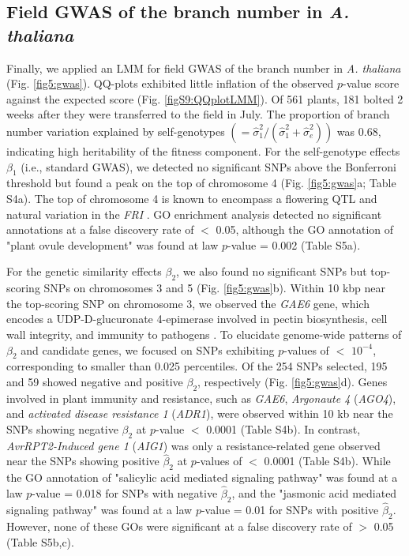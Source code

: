 \documentclass[12pt,]{article}
\begin{document}
\subsection{Field GWAS of the branch number in \textit{A. thaliana}}
Finally, we applied an LMM for field GWAS of the branch number in \textit{A. thaliana} (Fig. \ref{fig5:gwas}). QQ-plots exhibited little inflation of the observed $p$-value score against the expected score (Fig. \ref{figS9:QQplotLMM}). Of 561 plants, 181 bolted 2 weeks after they were transferred to the field in July. The proportion of branch number variation explained by self-genotypes $(=\hat{\sigma}^2_1/(\hat{\sigma}^2_1 + \hat{\sigma}^2_e))$ was 0.68, indicating high heritability of the fitness component. For the self-genotype effects $\beta_1$ (i.e., standard GWAS), we detected no significant SNPs above the Bonferroni threshold but found a peak on the top of chromosome 4 (Fig. \ref{fig5:gwas}a; Table S4a). The top of chromosome 4 is known to encompass a flowering QTL and natural variation in the \textit{FRI} \citep{aranzana2005genome}. GO enrichment analysis detected no significant annotations at a false discovery rate of $<$ 0.05, although the GO annotation of "plant ovule development" was found at law $p$-value = 0.002 (Table S5a). 

For the genetic similarity effects $\beta_2$, we also found no significant SNPs but top-scoring SNPs on chromosomes 3 and 5 (Fig. \ref{fig5:gwas}b). Within 10 kbp near the top-scoring SNP on chromosome 3, we observed the \textit{GAE6} gene, which encodes a UDP-D-glucuronate 4-epimerase involved in pectin biosynthesis, cell wall integrity, and immunity to pathogens \citep{bethke2016pectin}. To elucidate genome-wide patterns of $\beta_2$ and candidate genes, we focused on SNPs exhibiting $p$-values of $<$ $10^{-4}$, corresponding to smaller than 0.025 percentiles. Of the 254 SNPs selected, 195 and 59 showed negative and positive $\beta_2$, respectively (Fig. \ref{fig5:gwas}d). Genes involved in plant immunity and resistance, such as \textit{GAE6}, \textit{Argonaute 4} (\textit{AGO4}), and \textit{ activated disease resistance 1} (\textit{ADR1}), were observed within 10 kb near the SNPs showing negative $\beta_2$ at $p$-value $<$ 0.0001 (Table S4b). In contrast, \textit{AvrRPT2-Induced gene 1} (\textit{AIG1}) was only a resistance-related gene observed near the SNPs showing positive $\hat{\beta}_2$ at $p$-values of $<$ 0.0001 (Table S4b). While the GO annotation of "salicylic acid mediated signaling pathway" was found at a law $p$-value = 0.018 for SNPs with negative $\hat{\beta}_2$, and the "jasmonic acid mediated signaling pathway" was found at a law $p$-value = 0.01 for SNPs with positive $\hat{\beta}_2$. However, none of these GOs were significant at a false discovery rate of $>$ 0.05 (Table S5b,c).
\end{document}
